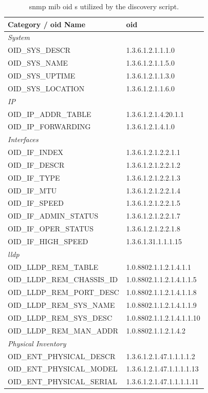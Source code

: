 \documentclass[11pt,a4paper]{report}
\begin{document}
\begin{table}[H]
\centering
\caption{\gls{snmp}  \gls{mib}   \gls{oid} s utilized by the discovery script.}
\label{tab:\gls{snmp}-oids}
\small
\begin{tabular}{ll}
\toprule
\textbf{Category /  \gls{oid}  Name} & \textbf{ \gls{oid} } \\
\midrule
\multicolumn{2}{l}{\textit{System}} \\
OID\_SYS\_DESCR    & 1.3.6.1.2.1.1.1.0 \\
OID\_SYS\_NAME     & 1.3.6.1.2.1.1.5.0 \\
OID\_SYS\_UPTIME   & 1.3.6.1.2.1.1.3.0 \\
OID\_SYS\_LOCATION & 1.3.6.1.2.1.1.6.0 \\
\midrule
\multicolumn{2}{l}{\textit{IP}} \\
OID\_IP\_ADDR\_TABLE & 1.3.6.1.2.1.4.20.1.1 \\
OID\_IP\_FORWARDING  & 1.3.6.1.2.1.4.1.0 \\
\midrule
\multicolumn{2}{l}{\textit{Interfaces}} \\
OID\_IF\_INDEX       & 1.3.6.1.2.1.2.2.1.1 \\
OID\_IF\_DESCR       & 1.3.6.1.2.1.2.2.1.2 \\
OID\_IF\_TYPE        & 1.3.6.1.2.1.2.2.1.3 \\
OID\_IF\_MTU         & 1.3.6.1.2.1.2.2.1.4 \\
OID\_IF\_SPEED       & 1.3.6.1.2.1.2.2.1.5 \\
OID\_IF\_ADMIN\_STATUS & 1.3.6.1.2.1.2.2.1.7 \\
OID\_IF\_OPER\_STATUS  & 1.3.6.1.2.1.2.2.1.8 \\
OID\_IF\_HIGH\_SPEED   & 1.3.6.1.31.1.1.1.15 \\
\midrule
\multicolumn{2}{l}{\textit{\gls{lldp} }} \\
OID\_LLDP\_REM\_TABLE      & 1.0.8802.1.1.2.1.4.1.1 \\
OID\_LLDP\_REM\_CHASSIS\_ID & 1.0.8802.1.1.2.1.4.1.1.5 \\
OID\_LLDP\_REM\_PORT\_DESC  & 1.0.8802.1.1.2.1.4.1.1.8 \\
OID\_LLDP\_REM\_SYS\_NAME   & 1.0.8802.1.1.2.1.4.1.1.9 \\
OID\_LLDP\_REM\_SYS\_DESC   & 1.0.8802.1.1.2.1.4.1.1.10 \\
OID\_LLDP\_REM\_MAN\_ADDR   & 1.0.8802.1.1.2.1.4.2 \\
\midrule
\multicolumn{2}{l}{\textit{Physical Inventory}} \\
OID\_ENT\_PHYSICAL\_DESCR  & 1.3.6.1.2.1.47.1.1.1.1.2 \\
OID\_ENT\_PHYSICAL\_MODEL  & 1.3.6.1.2.1.47.1.1.1.1.13 \\
OID\_ENT\_PHYSICAL\_SERIAL & 1.3.6.1.2.1.47.1.1.1.1.11 \\
\bottomrule
\end{tabular}
\end{table}
\end{document}
